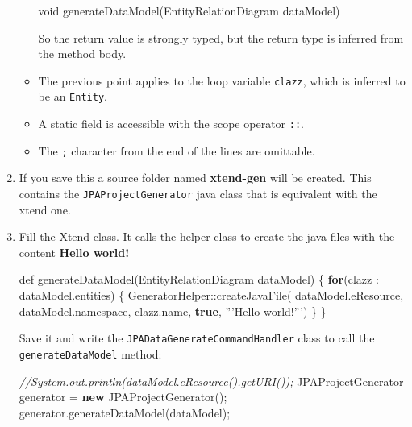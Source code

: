 \documentclass[]{report}
\newenvironment{Shaded}{}{}
\newcommand{\KeywordTok}[1]{\textcolor[rgb]{0.00,0.44,0.13}{\textbf{{#1}}}}
\newcommand{\DataTypeTok}[1]{\textcolor[rgb]{0.56,0.13,0.00}{{#1}}}
\newcommand{\CommentTok}[1]{\textcolor[rgb]{0.38,0.63,0.69}{\textit{{#1}}}}
\newcommand{\FunctionTok}[1]{\textcolor[rgb]{0.02,0.16,0.49}{{#1}}}
\newcommand{\NormalTok}[1]{{#1}}
\begin{document}
\begin{enumerate}
\begin{itemize}
\begin{Shaded}
\begin{Highlighting}[]
\DataTypeTok{void} \FunctionTok{generateDataModel}\NormalTok{(EntityRelationDiagram dataModel)}
\end{Highlighting}
\end{Shaded}

    So the return value is strongly typed, but the return type is
    inferred from the method body.
  \item
    The previous point applies to the loop variable \texttt{clazz},
    which is inferred to be an \texttt{Entity}.
  \item
    A static field is accessible with the scope operator \texttt{::}.
  \item
    The \texttt{;} character from the end of the lines are omittable.
  \end{itemize}
\item
  If you save this a source folder named \textbf{xtend-gen} will be
  created. This contains the \texttt{JPAProjectGenerator} java class
  that is equivalent with the xtend one.
\item
  Fill the Xtend class. It calls the helper class to create the java
  files with the content \textbf{Hello world!}

\begin{Shaded}
\begin{Highlighting}[]
\NormalTok{def }\FunctionTok{generateDataModel}\NormalTok{(EntityRelationDiagram dataModel) \{}
    \KeywordTok{for}\NormalTok{(clazz : dataModel.}\FunctionTok{entities}\NormalTok{) \{}
        \NormalTok{GeneratorHelper::}\FunctionTok{createJavaFile}\NormalTok{(}
            \NormalTok{dataModel.}\FunctionTok{eResource}\NormalTok{,}
            \NormalTok{dataModel.}\FunctionTok{namespace}\NormalTok{,}
            \NormalTok{clazz.}\FunctionTok{name}\NormalTok{,}
            \KeywordTok{true}\NormalTok{,}
            \NormalTok{'''Hello world!''')}
    \NormalTok{\}}
\NormalTok{\}}
\end{Highlighting}
\end{Shaded}

  Save it and write the \texttt{JPADataGenerateCommandHandler} class to
  call the \texttt{generateDataModel} method:

\begin{Shaded}
\begin{Highlighting}[]
\CommentTok{//System.out.println(dataModel.eResource().getURI());}
\NormalTok{JPAProjectGenerator generator = }\KeywordTok{new} \FunctionTok{JPAProjectGenerator}\NormalTok{();}
\NormalTok{generator.}\FunctionTok{generateDataModel}\NormalTok{(dataModel);}
\end{Highlighting}
\end{Shaded}


\end{enumerate}
\end{document}
